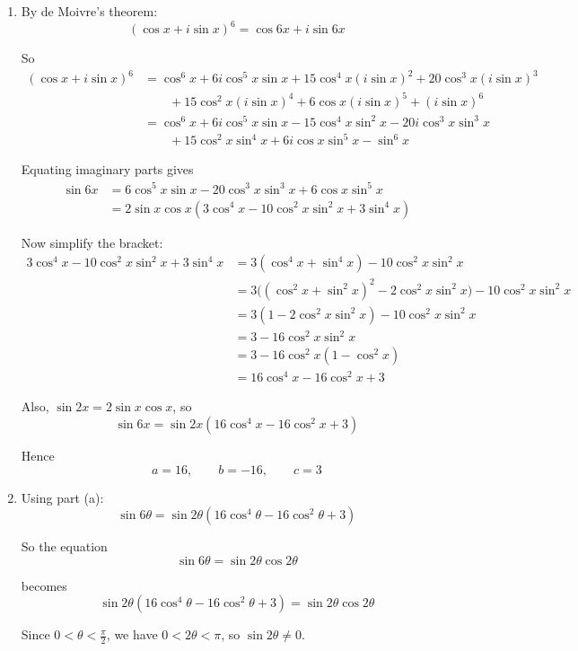 \documentclass[leqno]{article}
\begin{document}
\begin{enumerate}[
  label=\textbf{\arabic*.},
  leftmargin=*,
  topsep=0pt,
  partopsep=0pt,
  parsep=0pt
]
\vspace*{10pt}

\begin{djsSolution}
\begin{enumerate}[label=\textbf{(\alph*)}]
  \item By de Moivre's theorem:
\[
(\cos x+i\sin x)^6=\cos 6x+i\sin 6x
\]

So
\begin{align*}
(\cos x+i\sin x)^6
&=\cos^6x+6i\cos^5x\sin x+15\cos^4x(i\sin x)^2+20\cos^3x(i\sin x)^3 \\
&\qquad +15\cos^2x(i\sin x)^4+6\cos x(i\sin x)^5+(i\sin x)^6 \\
&=\cos^6x+6i\cos^5x\sin x-15\cos^4x\sin^2x-20i\cos^3x\sin^3x \\
&\qquad +15\cos^2x\sin^4x+6i\cos x\sin^5x-\sin^6x
\end{align*}

Equating imaginary parts gives
\begin{align*}
\sin 6x
&=6\cos^5x\sin x-20\cos^3x\sin^3x+6\cos x\sin^5x \\
&=2\sin x\cos x\left(3\cos^4x-10\cos^2x\sin^2x+3\sin^4x\right)
\end{align*}

Now simplify the bracket:
\begin{align*}
3\cos^4x-10\cos^2x\sin^2x+3\sin^4x
&=3(\cos^4x+\sin^4x)-10\cos^2x\sin^2x \\
&=3\bigl((\cos^2x+\sin^2x)^2-2\cos^2x\sin^2x\bigr)-10\cos^2x\sin^2x \\
&=3(1-2\cos^2x\sin^2x)-10\cos^2x\sin^2x \\
&=3-16\cos^2x\sin^2x \\
&=3-16\cos^2x(1-\cos^2x) \\
&=16\cos^4x-16\cos^2x+3
\end{align*}

Also, $\sin 2x=2\sin x\cos x$, so
\[
\sin 6x=\sin 2x\left(16\cos^4x-16\cos^2x+3\right)
\]

Hence
\[
a=16,\qquad b=-16,\qquad c=3
\]

  \item Using part (a):
\[
\sin 6\theta=\sin 2\theta\left(16\cos^4\theta-16\cos^2\theta+3\right)
\]

So the equation
\[
\sin 6\theta=\sin 2\theta\cos 2\theta
\]

becomes
\[
\sin 2\theta\left(16\cos^4\theta-16\cos^2\theta+3\right)=\sin 2\theta\cos 2\theta
\]

Since $0<\theta<\frac{\pi}{2}$, we have $0<2\theta<\pi$, so $\sin 2\theta\neq 0$.


\end{enumerate}
\end{djsSolution}
\end{enumerate}
\end{document}
